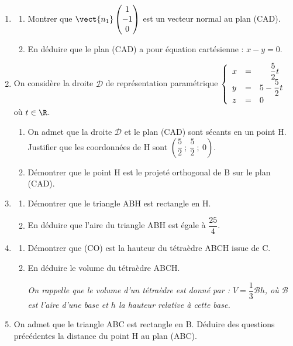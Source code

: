 \begin{enumerate}
	\item \begin{enumerate}
		\item Montrer que $\vect{n_{1}}\begin{pmatrix}1 \\ -1 \\ 0\end{pmatrix}$ est un vecteur normal au plan (CAD).

		\item En déduire que le plan (CAD) a pour équation cartésienne : \quad $x-y=0$.
	\end{enumerate}

	\item On considère la droite $\mathcal{D}$ de représentation paramétrique \renewcommand\arraystretch{1.8}$\left\{\begin{array}{l c l}x&=&\phantom{5 -}\dfrac{5}{2} t \\ y&=&5-\dfrac{5}{2} t \\ z&=&0\end{array}\right.$ où $t \in \R$.\renewcommand\arraystretch{1}


	\begin{enumerate}
		\item On admet que la droite $\mathcal{D}$ et le plan (CAD) sont sécants en un point H. Justifier que les coordonnées de H sont $\left(\dfrac{5}{2}~;~\dfrac{5}{2}~;~0\right)$.

		\item Démontrer que le point H est le projeté orthogonal de B sur le plan (CAD).
	\end{enumerate}

	\item \begin{enumerate}
		\item Démontrer que le triangle ABH est rectangle en H.

		\item En déduire que l'aire du triangle ABH est égale à $\dfrac{25}{4}$.
	\end{enumerate}

	\item \begin{enumerate}
		\item Démontrer que (CO) est la hauteur du tétraèdre ABCH issue de C.

		\item En déduire le volume du tétraèdre ABCH.

		\emph{On rappelle que le volume d'un tétraèdre est donné par : $V=\dfrac{1}{3} \mathcal{B }h$, où $\mathcal{B}$ est l'aire d'une base et $h$ la hauteur relative à cette base.}
	\end{enumerate}

	\item On admet que le triangle ABC est rectangle en B. Déduire des questions précédentes la distance du point H au plan (ABC).
\end{enumerate}

\medskip
